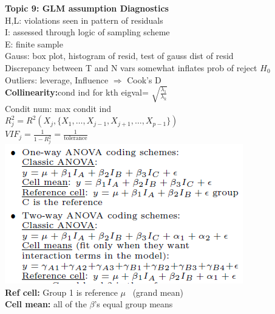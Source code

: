\documentclass[10pt,landscape]{article}
\newcommand{\B}{\beta}
\newcommand{\ra}{\Rightarrow}
\begin{document}
\begin{multicols*}{4}
\textbf{Topic 9: GLM assumption Diagnostics}\\
H,L: violations seen in pattern of residuals\\
I: assessed through logic of sampling scheme\\
E: finite sample\\
Gauss: box plot, histogram of resid, test of gauss dist of resid\\
Discrepancy between T and N vars somewhat inflates prob of reject $H_0$\\
Outliers: leverage, Influence $\ra$ Cook's D\\



\textbf{Collinearity:}cond ind for kth eigval= $\sqrt{\frac{\lambda_1}{\lambda_k}}$\\
Condit num: max condit ind\\
$R_j^2=R^2(X_j,\{X_1,\dots, X_{j-1},X_{j+1},\dots,X_{p-1}\})$\\
$VIF_j=\frac{1}{1-R_j^2}=\frac{1}{\text{tolerance}}$\\

\includegraphics[scale=.6]{fig/an.png}\\
\textbf{Ref cell:} Group 1 is reference $\mu$ \ (grand mean)\\
\textbf{Cell mean:} all of the $\B$'s equal group means\\


\end{multicols*}
\end{document}
